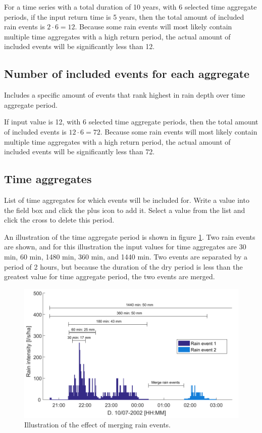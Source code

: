 \documentclass[a4paper,11pt]{refart}
\begin{document}
For a time series with a total duration of 10 years, with 6 selected time aggregate periods, if the input return time is 5 years, then the total amount of included rain events is $2\cdot 6 = 12$. Because some rain events will most likely contain multiple time aggregates with a high return period, the actual amount of included events will be significantly less than 12.
		\subsection{Number of included events for each aggregate}
		Includes a specific amount of events that rank highest in rain depth over time aggregate period. 
		
		If input value is 12, with 6 selected time aggregate periods, then the total amount of included events is $12\cdot 6 = 72$. Because some rain events will most likely contain multiple time aggregates with a high return period, the actual amount of included events will be significantly less than 72.
		
		\subsection{Time aggregates}
		List of time aggregates for which events will be included for. Write a value into the field box and click the plus icon to add it. Select a value from the list and click the cross to delete this period. 
		
		An illustration of the time aggregate period is shown in figure \ref{fig:RainEventPatterns}. Two rain events are shown, and for this illustration the input values for time aggregates are 30 min, 60 min, 1480 min, 360 min, and 1440 min. Two events are separated by a period of 2 hours, but because the duration of the dry period is less than the greatest value for time aggregate period, the two events are merged. 
		\begin{figure}[H]\centering
			\includegraphics[scale=0.7]{RainEventPatterns.pdf}
			\caption{Illustration of the effect of merging rain events.}\label{fig:RainEventPatterns}
		\end{figure}
\end{document}
